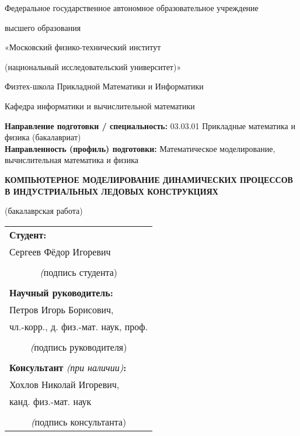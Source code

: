 
\begin{titlepage}
    \begin{center}
        Федеральное государственное автономное образовательное учреждение
        
        высшего образования
        
        «Московский физико-технический институт
        
        (национальный исследовательский университет)»
        
        Физтех-школа Прикладной Математики и Информатики
        
        Кафедра информатики и вычислительной математики
    \end{center}

    \begin{flushleft}
        \textbf{Направление подготовки / специальность:} 03.03.01  Прикладные математика и физика (бакалавриат)\\
        
        \textbf{Направленность (профиль) подготовки:} Математическое моделирование, вычислительная математика и физика
    \end{flushleft}

    \begin{center}
        \vspace{\fill}
        \Large \bfseries
        КОМПЬЮТЕРНОЕ МОДЕЛИРОВАНИЕ ДИНАМИЧЕСКИХ ПРОЦЕССОВ В ИНДУСТРИАЛЬНЫХ ЛЕДОВЫХ КОНСТРУКЦИЯХ \vspace{1em}
        
        \normalsize \normalfont
        (бакалаврская работа)
        \vspace{\fill}
    \end{center}

    \hfill
    \begin{tabular}{@{}l@{}}
        \textbf{Студент:} \\
        Сергеев Фёдор Игоревич \\
        \medskip\\
        \hline\multicolumn{1}{c}{{\textit (подпись студента)}}\\
        \\
        \textbf{Научный руководитель:} \\
        Петров Игорь Борисович, \\
        чл.-корр., д. физ.-мат. наук, проф.\\
        \medskip\\
        \hline\multicolumn{1}{c}{{\textit (подпись руководителя)}}\\
        \\
        \textbf{Консультант} \textit{(при наличии)}\textbf{:} \\
        Хохлов Николай Игоревич, \\
        канд. физ.-мат. наук \\
        \medskip\\
        \hline\multicolumn{1}{c}{{\textit (подпись консультанта)}}
    \end{tabular}


\end{titlepage}
